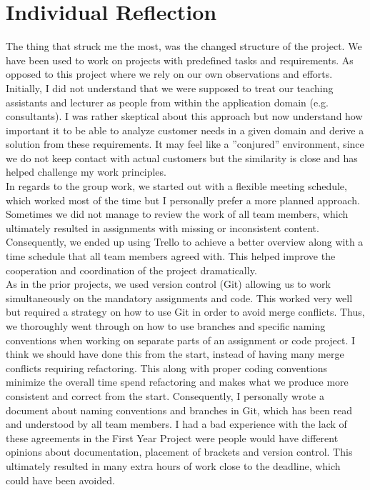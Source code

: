 \section{Individual Reflection}

The thing that struck me the most, was the changed structure of the project. We have been used to work on projects with predefined tasks and requirements. As opposed to this project where we rely on our own observations and efforts. Initially, I did not understand that we were supposed to treat our teaching assistants and lecturer as people from within the application domain (e.g. consultants). I was rather skeptical about this approach but now understand how important it to be able to analyze customer needs in a given domain and derive a solution from these requirements. It may feel like a ”conjured” environment, since we do not keep contact with actual customers but the similarity is close and has helped challenge my work principles. 
\\
In regards to the group work, we started out with a flexible meeting schedule, which worked most of the time but I personally prefer a more planned approach. Sometimes we did not manage to review the work of all team members, which ultimately resulted in assignments with missing or inconsistent content. Consequently, we ended up using Trello to achieve a better overview along with a time schedule that all team members agreed with. This helped improve the cooperation and coordination of the project dramatically. 
\\
As in the prior projects, we used version control (Git) allowing us to work simultaneously on the mandatory assignments and code. This worked very well but required a strategy on how to use Git in order to avoid merge conflicts. Thus, we thoroughly went through on how to use branches and specific naming conventions when working on separate parts of an assignment or code project. I think we should have done this from the start, instead of having many merge conflicts requiring refactoring. This along with proper coding conventions minimize the overall time spend refactoring and makes what we produce more consistent and correct from the start. Consequently, I personally wrote a document about naming conventions and branches in Git, which has been read and understood by all team members. I had a bad experience with the lack of these agreements in the First Year Project were people would have different opinions about documentation, placement of brackets and version control. This ultimately resulted in many extra hours of work close to the deadline, which could have been avoided. 
